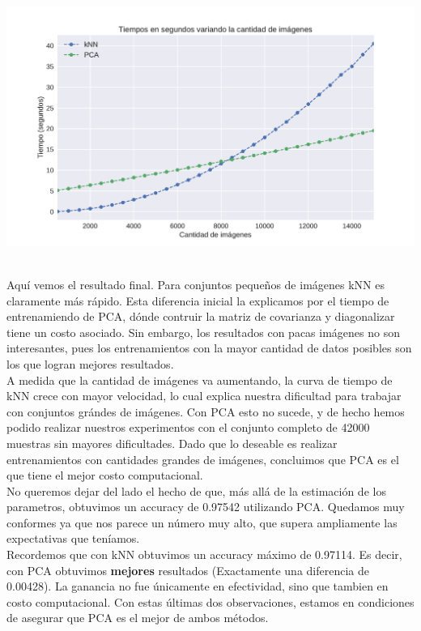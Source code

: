 {\centering
    \includegraphics[scale=0.60]{informe/imagenes/tiemposKnnVsPsa.pdf} \\
}
$ $\newline

Aquí vemos el resultado final. Para conjuntos pequeños de imágenes kNN es claramente más rápido. Esta diferencia inicial la explicamos por el tiempo de entrenamiendo de PCA, dónde contruir la matriz de covarianza y diagonalizar tiene un costo asociado. Sin embargo, los resultados con pacas imágenes no son interesantes, pues los entrenamientos con la mayor cantidad de datos posibles son los que logran mejores resultados. \\

A medida que la cantidad de imágenes va aumentando, la curva de tiempo de kNN crece con mayor velocidad, lo cual explica nuestra dificultad para trabajar con conjuntos grándes de imágenes. Con PCA esto no sucede, y de hecho hemos podido realizar nuestros experimentos con el conjunto completo de 42000 muestras sin mayores dificultades. Dado que lo deseable es realizar entrenamientos con cantidades grandes de imágenes, concluimos que PCA es el que tiene el mejor costo computacional. \\

No queremos dejar del lado el hecho de que, más allá de la estimación de los parametros, obtuvimos un accuracy de 0.97542 utilizando PCA. Quedamos muy conformes ya que nos parece un número muy alto, que supera ampliamente las expectativas que teníamos. \\

Recordemos que con kNN obtuvimos un accuracy máximo de 0.97114. Es decir, con PCA obtuvimos \textbf{mejores} resultados (Exactamente una diferencia de 0.00428). La ganancia no fue únicamente en efectividad, sino que tambien en costo computacional. Con estas últimas dos observaciones, estamos en condiciones de asegurar que PCA es el mejor de ambos métodos. \\

